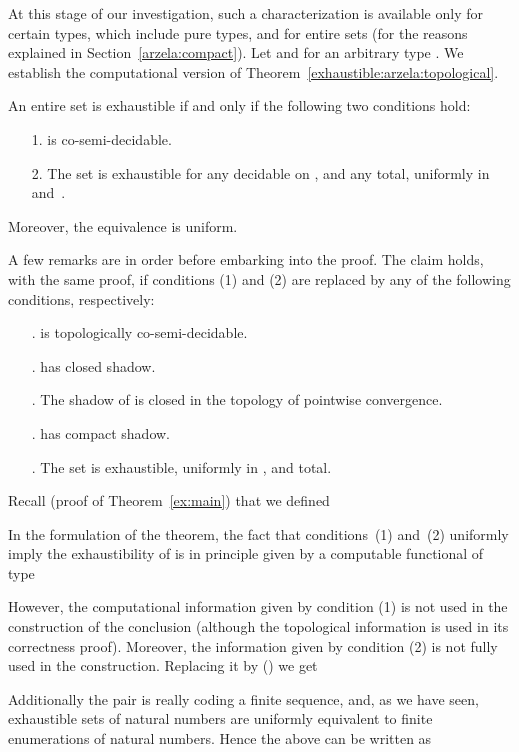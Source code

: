 \documentclass{LMCS}
\begin{document}
At this stage of our investigation, such a characterization is
available only for certain types, which include pure types, and for
entire sets (for the reasons explained in
Section~\ref{arzela:compact}). Let  and 
for an arbitrary type .  We establish the computational
version of Theorem~\ref{exhaustible:arzela:topological}.
\pagebreak[3]
\begin{thm} \label{exhaustible:arzela}
  An entire set  is exhaustible if and only if 
  the following two conditions hold:
  \begin{enumerate}
  \item[1.]  is co-semi-decidable.
  \item[2.] The set  is exhaustible for any 
    decidable on , and any  total, uniformly in~
    and~.
  \end{enumerate}
  Moreover, the equivalence is uniform. 
\end{thm}

\medskip

A few remarks are in order before embarking into the proof.
The claim holds, with the same proof, if
conditions (1) and (2) are replaced by any of the following
conditions, respectively:
\begin{enumerate}
\item[.]  is topologically co-semi-decidable.
\item[.]  has closed shadow.
\item[.] The shadow of  is closed in the topology of
  pointwise convergence.
\item[.]  has compact shadow.
\item[.]  The set  is exhaustible, uniformly
    in ,  and  total.
\end{enumerate}
Recall (proof of Theorem~\ref{ex:main}) that
we defined


In the formulation of the theorem, the fact that
conditions~(1) and~(2) uniformly imply the exhaustibility of  is in
principle given by a computable functional of type

{\footnotesize
}

However, the computational information given by condition (1) is not
used in the construction of the conclusion (although the topological
information is used in its correctness proof). Moreover, the
information given by condition (2) is not fully used in the
construction. Replacing it by () we get

Additionally the pair  is really coding a finite sequence,
and, as we have seen, exhaustible sets of natural numbers are uniformly
equivalent to finite enumerations of natural numbers. Hence the
above can be written as
\end{document}
